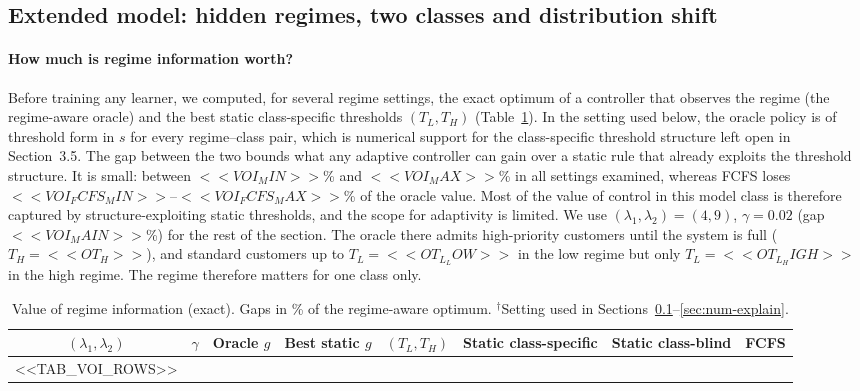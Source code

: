 \subsection{Extended model: hidden regimes, two classes and distribution shift}\label{sec:num-extended}

\paragraph{How much is regime information worth?} Before training any learner, we computed, for several regime settings, the exact optimum of a controller that observes the regime (the regime-aware oracle) and the best static class-specific thresholds $(T_L,T_H)$ (Table~\ref{tab:voi}). In the setting used below, the oracle policy is of threshold form in $s$ for every regime--class pair, which is numerical support for the class-specific threshold structure left open in Section~3.5. The gap between the two bounds what any adaptive controller can gain over a static rule that already exploits the threshold structure. It is small: between $<<VOI_MIN>>$\% and $<<VOI_MAX>>$\% in all settings examined, whereas FCFS loses $<<VOI_FCFS_MIN>>$--$<<VOI_FCFS_MAX>>$\% of the oracle value. Most of the value of control in this model class is therefore captured by structure-exploiting static thresholds, and the scope for adaptivity is limited. We use $(\lambda_1,\lambda_2)=(4,9)$, $\gamma=0.02$ (gap $<<VOI_MAIN>>$\%) for the rest of the section. The oracle there admits high-priority customers until the system is full ($T_H=<<OT_H>>$), and standard customers up to $T_L=<<OT_L_LOW>>$ in the low regime but only $T_L=<<OT_L_HIGH>>$ in the high regime. The regime therefore matters for one class only.

\begin{table}[t]
\centering\small
\caption{Value of regime information (exact). Gaps in \% of the regime-aware optimum. $^\dagger$Setting used in Sections~\ref{sec:num-extended}--\ref{sec:num-explain}.}\label{tab:voi}
\begin{tabular}{@{}cc cc c ccc@{}}
\toprule
$(\lambda_1,\lambda_2)$ & $\gamma$ & Oracle $g$ & Best static $g$ & $(T_L,T_H)$ & Static class-specific & Static class-blind & FCFS\\
\midrule
<<TAB_VOI_ROWS>>
\bottomrule
\end{tabular}
\end{table}

